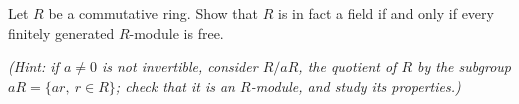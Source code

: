 \begin{problem}
Let $R$ be a commutative ring. Show that $R$ is in fact a field if and only if every finitely generated $R$-module is free. 
\end{problem}
\textit{(Hint: if $a\neq 0$ is not invertible, consider $R/aR$, the quotient of $R$
by the subgroup $aR=\{ar,\ r\in R\}$; check that it is an $R$-module, and study its properties.)}
